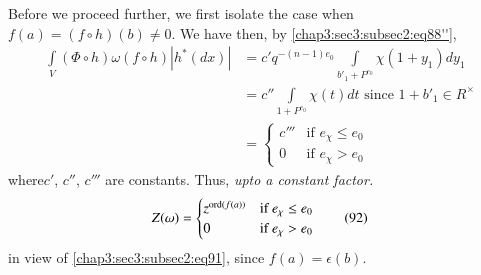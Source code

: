 Before we proceed further, we first isolate the case when
$f(a)=(f\circ h)(b)\neq 0$. We have then, by \ref{chap3:sec3:subsec2:eq88''},
\begin{align*}
  \int\limits_{V}(\Phi\circ h)\omega(f\circ h)|h^{\ast}(dx)| &=
  c'q^{-(n-1)e_{0}}\int\limits_{b'_{1}+P^{e_{0}}}\chi(1+y_{1})dy_{1}\\
  &= c''\int\limits_{1+P^{e_{0}}}\chi(t)dt\text{ \ since \ } 1+b'_{1}\in
  R^{\times}\\
  &=\begin{cases}
  c''' & \text{if } e_{\chi}\leq e_{0}\\
  0 & \text{if } e_{\chi}>e_{0}
  \end{cases}
\end{align*}
where\pageoriginale $c'$, $c''$, $c'''$ are constants. Thus, {\em upto
  a constant factor.}
\begin{equation*}
  Z(\omega)=
  \begin{cases}
    z^{\operatorname{ord}(f(a))} & \text{if } e_{\chi}\leq e_{0}\\
    0 & \text{if } e_{\chi}>e_{0}
  \end{cases}\tag{92}\label{chap3:sec3:subsec3:eq92}
\end{equation*}
in view of \ref{chap3:sec3:subsec2:eq91}, since $f(a)=\epsilon(b)$.

\subsection{}\label{chap3:sec3:subsec4}%

